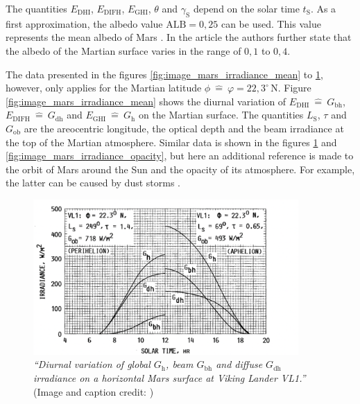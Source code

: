 The quantities $E_{\mathrm{DHI}}$, $E_{\mathrm{DIFH}}$, $E_{\mathrm{GHI}}$, $\theta$ and $\gamma_\mathrm{S}$ depend on the solar time $t_\mathrm{S}$. As a first approximation, the albedo value $\mathrm{ALB} = 0,25$ can be used. This value represents the mean albedo of Mars \cite{Grayzeck:2020}. In the article \cite{Appelbaum:1990} the authors further state that the albedo of the Martian surface varies in the range of $0,1$ to $0,4$.

The data presented in the figures \ref{fig:image_mars_irradiance_mean} to \ref{fig:image_mars_irradiance_orbit}, however, only applies for the Martian latitude $\phi \ \widehat{=} \ \varphi = 22,3^\circ \, \mathrm{N}$. Figure \ref{fig:image_mars_irradiance_mean} shows the diurnal variation of $E_{\mathrm{DHI}} \ \widehat{=} \ G_\mathrm{bh}$, $E_{\mathrm{DIFH}} \ \widehat{=} \ G_\mathrm{dh}$ and $E_{\mathrm{GHI}} \ \widehat{=} \ G_\mathrm{h}$ on the Martian surface. The quantities $L_\mathrm{S}$, $\tau$ and $G_\mathrm{ob}$ are the areocentric longitude, the optical depth and the beam irradiance at the top of the Martian atmosphere. Similar data is shown in the figures \ref{fig:image_mars_irradiance_orbit} and \ref{fig:image_mars_irradiance_opacity}, but here an additional reference is made to the orbit of Mars around the Sun and the opacity of its atmosphere. For example, the latter can be caused by dust storms \cite{Appelbaum:1990}. 
\begin{figure}[h!]
	\centering
  	\includegraphics[width = 0.9\textwidth]{images/image_mars_irradiance_orbit}
  	\caption{\textit{``Diurnal variation of global $G_\mathrm{h}$, beam $G_\mathrm{bh}$ and diffuse $G_\mathrm{dh}$ irradiance on a horizontal Mars surface at Viking Lander VL1.''} (Image and caption credit: \cite{Appelbaum:1990})}
	\label{fig:image_mars_irradiance_orbit}
\end{figure}
